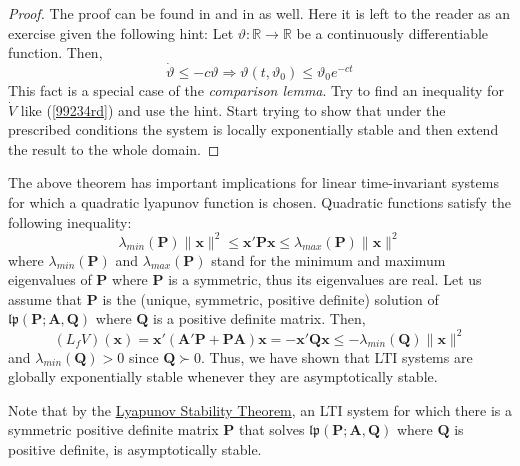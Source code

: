 \documentclass[a4paper,10pt,oneside]{book}
\begin{document}
\begin{proof}
 The proof can be found in \cite{LihPha01} and in \cite{Kha02} as well. Here it is left to 
the reader as an exercise given the following hint: Let $\vartheta:\mathbb{R}\to\mathbb{R}$ be a continuously differentiable
function. Then,
\begin{equation}\label{99234rd}
 \dot{\vartheta}\leq -c\vartheta \Rightarrow \vartheta(t,\vartheta_0)\leq \vartheta_0 e^{-ct}
\end{equation}
This fact is a special case of the \emph{comparison lemma}. Try to find an inequality for $\dot{V}$
like (\ref{99234rd}) and use the hint. Start trying to show that under the prescribed conditions the 
system is locally exponentially stable and then extend the result to the whole domain.
\end{proof}
The above theorem has important implications for linear time-invariant systems for which a 
quadratic lyapunov function is chosen. Quadratic functions satisfy the following inequality:
\begin{equation}
 \lambda_{min}(\mathbf{P})\|\mathbf{x}\|^2 
 \leq \mathbf{x}'\mathbf{Px} \leq \lambda_{max}(\mathbf{P})\|\mathbf{x}\|^2
\end{equation}
where $\lambda_{min}(\mathbf{P})$ and $\lambda_{max}(\mathbf{P})$
stand for the minimum and maximum eigenvalues of $\mathbf{P}$ where $\mathbf{P}$ is a symmetric,
thus its eigenvalues are real. Let us assume that $\mathbf{P}$ is the (unique, symmetric, positive definite)
solution of $\mathfrak{lp}(\mathbf{P};\mathbf{A},\mathbf{Q})$ where $\mathbf{Q}$ is a positive definite matrix.
Then,
\begin{equation}
 (L_fV)(\mathbf{x})=\mathbf{x}'(\mathbf{A}'\mathbf{P}+\mathbf{PA})\mathbf{x}=
-\mathbf{x}'\mathbf{Qx}\leq -\lambda_{min}(\mathbf{Q})\|\mathbf{x}\|^2
\end{equation}
and $\lambda_{min}(\mathbf{Q})>0$ since $\mathbf{Q}\succ 0$. Thus, we have shown that LTI systems
are globally exponentially stable whenever they are asymptotically stable.

Note that by the \hyperlink{lst}{Lyapunov Stability Theorem}, an LTI system for which there is a
symmetric positive definite matrix $\mathbf{P}$ that solves $\mathfrak{lp}(\mathbf{P};\mathbf{A},\mathbf{Q})$
where $\mathbf{Q}$ is positive definite, is asymptotically stable.
\end{document}

